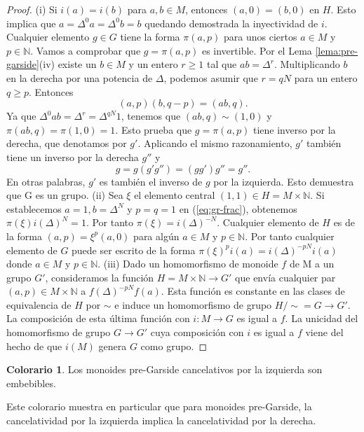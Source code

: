 \documentclass[12pt]{book}
\theoremstyle{definition}
\newtheorem{colo}{Colorario}[section]
\begin{document}
\begin{proof} (i) Si $i(a)=i(b)$ para $a,b\in M$, entonces $(a,0)=(b,0)$ en $H$. Esto implica que $a=\Delta^0a=\Delta^0b=b$ quedando demostrada la inyectividad de $i$.
\newline
\newline
Cualquier elemento $g\in G$ tiene la forma $\pi(a,p)$ para unos ciertos $a\in M$ y $p\in\mathbb{N}$. Vamos a comprobar que $g=\pi(a,p)$ es invertible. Por el Lema \ref{lema:pre-garside}(iv) existe un $b\in M$ y un entero $r\geq 1$ tal que $ab=\Delta^r$. Multiplicando $b$ en la derecha por una potencia de $\Delta$, podemos asumir que $r=qN$ para un entero $q\geq p$. Entonces
\begin{equation}
(a,p)(b,q-p)=(ab,q).
\label{eq:gr-frac}
\end{equation}
Ya que $\Delta^0ab=\Delta^r=\Delta^{qN}1$, tenemos que $(ab,q)\sim(1,0)$ y $\pi(ab,q)=\pi(1,0)=1$. Esto prueba que $g=\pi(a,p)$ tiene inverso por la derecha, que denotamos por $g'$. Aplicando el mismo razonamiento, $g'$ también tiene un inverso por la derecha  $g''$ y
$$g=g(g'g'')=(gg')g''=g''.$$
En otras palabras, $g'$ es también el inverso de $g$ por la izquierda. Esto demuestra que G es un grupo.
\newline
\newline
(ii) Sea $\xi$ el elemento central $(1,1)\in H=M\times\mathbb{N}$. Si establecemos $a=1,b=\Delta^N$ y $p=q=1$ en (\ref{eq:gr-frac}), obtenemos $\pi(\xi)i(\Delta)^N=1$. Por tanto $\pi(\xi)=i(\Delta)^{-N}$. Cualquier elemento de $H$ es de la forma $(a,p)=\xi^p(a,0)$ para algún $a\in M$ y $p\in\mathbb{N}$. Por tanto cualquier elemento de $G$ puede ser escrito de la forma $\pi(\xi)^pi(a)=i(\Delta)^{-pN}i(a)$ donde $a\in M$ y $p\in\mathbb{N}$.
\newline
\newline
(iii) Dado un homomorfismo de monoide $f$ de M a un grupo $G'$, consideramos la función $H=M\times \mathbb{N}\rightarrow G'$ que envía cualquier par $(a,p)\in M\times \mathbb{N}$ a $f(\Delta)^{-pN}f(a)$. Esta función es constante en las clases de equivalencia de $H$ por $\sim$ e induce un homomorfismo de grupo $H/\sim=G\rightarrow G'$. La composición de esta última función con $i:M\rightarrow G$ es igual a $f$. La unicidad del homomorfismo de grupo $G\rightarrow G'$ cuya composición con $i$ es igual a $f$ viene del hecho de que $i(M)$ genera $G$ como grupo.
\end{proof}

\begin{colo}
Los monoides pre-Garside cancelativos por la izquierda son embebibles.
\label{colo:pre-garside-embe}
\end{colo}
Este colorario muestra en particular que para monoides pre-Garside, la cancelatividad por la izquierda implica la cancelatividad por la derecha.
\end{document}
